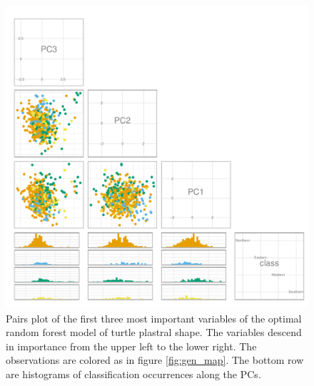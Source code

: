 \documentclass[12pt,letterpaper]{article}\usepackage{graphicx, color}
\begin{document}
\begin{figure}[ht]
  \centering
  \includegraphics[width = \textwidth]{figure/pca_imp}
  \caption{Pairs plot of the first three most important variables of the optimal random forest model of turtle plastral shape. The variables descend in importance from the upper left to the lower right. The observations are colored as in figure \ref{fig:gen_map}.  The bottom row are histograms of classification occurrences along the PCs.}
  \label{fig:imp_pc}
\end{figure}
\end{document}
